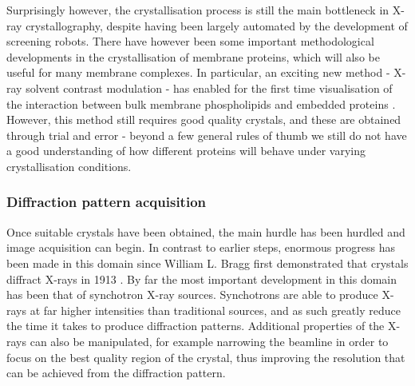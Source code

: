 \documentclass[a4paper,11pt,twoside,openright]{scrbook}
\begin{document}
Surprisingly however, the crystallisation process is still the main bottleneck in X-ray crystallography, despite having been largely automated by the development of screening robots. There have however been some important methodological developments in the crystallisation of membrane proteins, which will also be useful for many membrane complexes. In particular, an exciting new method - X-ray solvent contrast modulation - has enabled for the first time visualisation of the interaction between bulk membrane phospholipids and embedded proteins \cite{Norimatsu2017}. However, this method still requires good quality crystals, and these are obtained through trial and error - beyond a few general rules of thumb we still do not have a good understanding of how different proteins will behave under varying crystallisation conditions.



\subsubsection{Diffraction pattern acquisition}
Once suitable crystals have been obtained, the main hurdle has been hurdled and image acquisition can begin. In contrast to earlier steps, enormous progress has been made in this domain since William L. Bragg first demonstrated that crystals diffract X-rays in 1913 \cite{Bragg1913}. By far the most important development in this domain has been that of synchotron X-ray sources. Synchotrons are able to produce X-rays at far higher intensities than traditional sources, and as such greatly reduce the time it takes to produce diffraction patterns. Additional properties of the X-rays can also be manipulated, for example narrowing the beamline in order to focus on the best quality region of the crystal, thus improving the resolution that can be achieved from the diffraction pattern.
\end{document}
